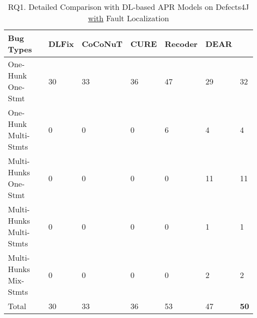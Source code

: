 \begin{table}
	\caption{RQ1. Detailed Comparison with DL-based APR Models on Defects4J \underline{with} Fault Localization}
	\vspace{-10pt}
	\begin{center}
        \small
          \tabcolsep 2.5pt
		\renewcommand{\arraystretch}{1} 
\begin{tabular}{p{2.9cm}<{\centering}|p{0.7cm}<{\centering}|p{1.1cm}<{\centering}|p{0.6cm}<{\centering}|p{0.8cm}<{\centering}|p{0.7cm}<{\centering}|p{0.7cm}}
			\hline
			Bug Types & DLFix& CoCoNuT & CURE & Recoder & DEAR & {\tool}\\\hline
			
			One-Hunk One-Stmt  & 30 & 33 & 36 & 47 & 29 & 32\\
			One-Hunk Multi-Stmts  & 0 &0 & 0 & 6 & 4 & 4\\ 
			Multi-Hunks One-Stmt  & 0 &0 & 0 & 0 & 11 &  11\\
			Multi-Hunks Multi-Stmts  & 0 &0 & 0 & 0 & 1 & 1\\
			Multi-Hunks Mix-Stmts  & 0 & 0 & 0 & 0 & 2 & 2\\\hline
			Total & 30 & 33 & 36 & 53 & 47 & {\bf 50}\\
			\hline
		\end{tabular}
		\label{multi-tab-with-FL}
	\end{center}
\vspace{-3pt}
\end{table}
















